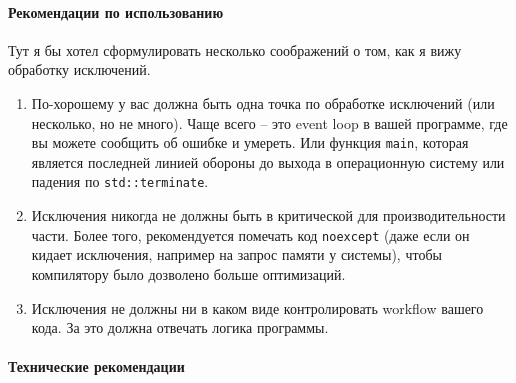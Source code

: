 \paragraph{Рекомендации по использованию}

Тут я бы хотел сформулировать несколько соображений о том, как я вижу обработку исключений.
\begin{enumerate}
\item По-хорошему у вас должна быть одна точка по обработке исключений (или несколько, но не много).
Чаще всего -- это event loop в вашей программе, где вы можете сообщить об ошибке и умереть.
Или функция \verb"main", которая является последней линией обороны до выхода в операционную систему или падения по \verb"std::terminate".

\item Исключения никогда не должны быть в критической для производительности части.
Более того, рекомендуется помечать код \verb"noexcept" (даже если он кидает исключения, например на запрос памяти у системы), чтобы компилятору было дозволено больше оптимизаций.

\item Исключения не должны ни в каком виде контролировать workflow вашего кода.
За это должна отвечать логика программы.
\end{enumerate}

\paragraph{Технические рекомендации}

